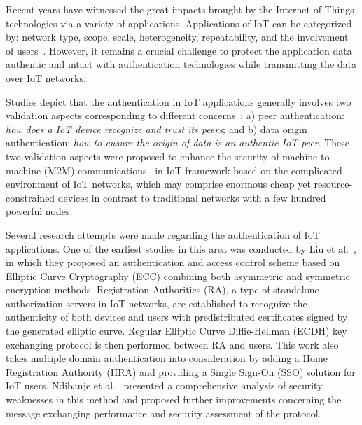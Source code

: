 Recent years have witnessed the great impacts brought by the Internet of Things technologies via a variety of applications. Applications of IoT can be categorized by: network type, scope, scale, heterogeneity, repeatability, and the involvement of users~\cite{DBLP:journals/fgcs/GubbiBMP13}. However, it remains a crucial challenge to protect the application data authentic and intact with authentication technologies while transmitting the data over IoT networks.

Studies depict that the authentication in IoT applications generally involves two validation aspects corresponding to different concerns~\cite{DBLP:journals/jnca/AlabaOHA17}: a) peer authentication: \textit{how does a IoT device recognize and trust its peers}; and b) data origin authentication: \textit{how to ensure the origin of data is an authentic IoT peer}. These two validation aspects were proposed to enhance the security of machine-to-machine (M2M) communications~\cite{martin2016authentication} in IoT framework based on the complicated environment of IoT networks, which may comprise enormous cheap yet resource-constrained devices in contrast to traditional networks with a few hundred powerful nodes.

Several research attempts were made regarding the authentication of IoT applications. One of the earliest studies in this area was conducted by Liu et al.~\cite{DBLP:conf/icdcsw/LiuXC12}, in which they proposed an authentication and access control scheme based on Elliptic Curve Cryptography (ECC) combining both asymmetric and symmetric encryption methods. Registration Authorities (RA), a type of standalone authorization servers in IoT networks, are established to recognize the authenticity of both devices and users with predistributed certificates signed by the generated elliptic curve. Regular Elliptic Curve Diffie-Hellman (ECDH) key exchanging protocol is then performed between RA and users. This work also takes multiple domain authentication into consideration by adding a Home Registration Authority (HRA) and providing a Single Sign-On (SSO) solution for IoT users. Ndibanje et al.~\cite{DBLP:journals/sensors/NdibanjeLL14} presented a comprehensive analysis of security weaknesses in this method and proposed further improvements concerning the message exchanging performance and security assessment of the protocol.

